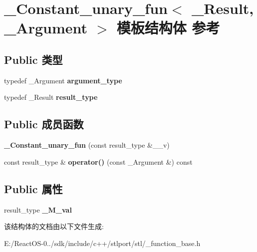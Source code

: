 \hypertarget{struct___constant__unary__fun}{}\section{\+\_\+\+Constant\+\_\+unary\+\_\+fun$<$ \+\_\+\+Result, \+\_\+\+Argument $>$ 模板结构体 参考}
\label{struct___constant__unary__fun}
\subsection*{Public 类型}
\begin{DoxyCompactItemize}
\item 
\mbox{\label{struct___constant__unary__fun_aed2468a2604b70419736e2e345425eb7}} 
typedef \+\_\+\+Argument {\bfseries argument\+\_\+type}
\item 
\mbox{\label{struct___constant__unary__fun_ac8a105b84b191ac2c996a12dba5bf57f}} 
typedef \+\_\+\+Result {\bfseries result\+\_\+type}
\end{DoxyCompactItemize}
\subsection*{Public 成员函数}
\begin{DoxyCompactItemize}
\item 
\mbox{\label{struct___constant__unary__fun_af8da0b71bb74941e035f3f617ef2e1b6}} 
{\bfseries \+\_\+\+Constant\+\_\+unary\+\_\+fun} (const result\+\_\+type \&\+\_\+\+\_\+v)
\item 
\mbox{\label{struct___constant__unary__fun_aec7aceee92ac9c36f08864d79dcf0e99}} 
const result\+\_\+type \& {\bfseries operator()} (const \+\_\+\+Argument \&) const
\end{DoxyCompactItemize}
\subsection*{Public 属性}
\begin{DoxyCompactItemize}
\item 
\mbox{\label{struct___constant__unary__fun_a395f36e98781373d75a559fb4563d3cb}} 
result\+\_\+type {\bfseries \+\_\+\+M\+\_\+val}
\end{DoxyCompactItemize}


该结构体的文档由以下文件生成\+:\begin{DoxyCompactItemize}
\item 
E\+:/\+React\+O\+S-\/0../sdk/include/c++/stlport/stl/\+\_\+function\+\_\+base.\+h\end{DoxyCompactItemize}

